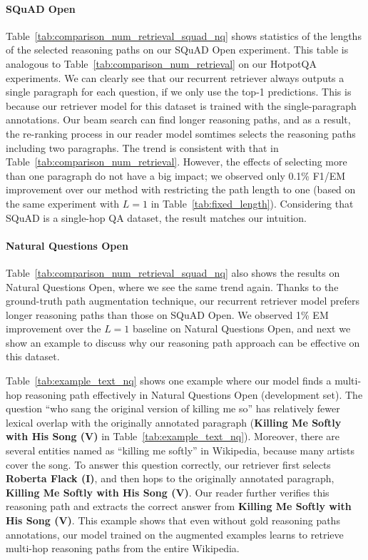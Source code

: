 \paragraph{SQuAD Open}

Table~\ref{tab:comparison_num_retrieval_squad_nq} shows statistics of the lengths of the selected reasoning paths on our SQuAD Open experiment.
This table is analogous to Table~\ref{tab:comparison_num_retrieval} on our HotpotQA experiments.
We can clearly see that our recurrent retriever always outputs a single paragraph for each question, if we only use the top-1 predictions.
This is because our retriever model for this dataset is trained with the single-paragraph annotations.
Our beam search can find longer reasoning paths, and as a result, the re-ranking process in our reader model somtimes selects the reasoning paths including two paragraphs.
The trend is consistent with that in Table~\ref{tab:comparison_num_retrieval}.
However, the effects of selecting more than one paragraph do not have a big impact; we observed only 0.1\% F1/EM improvement over our method with restricting the path length to one (based on the same experiment with $L=1$ in Table~\ref{tab:fixed_length}).
Considering that SQuAD is a single-hop QA dataset, the result matches our intuition.

\paragraph{Natural Questions Open}

Table~\ref{tab:comparison_num_retrieval_squad_nq} also shows the results on Natural Questions Open, where we see the same trend again.
Thanks to the ground-truth path augmentation technique, our recurrent retriever model prefers longer reasoning paths than those on SQuAD Open.
We observed 1\% EM improvement over the $L=1$ baseline on Natural Questions Open, and next we show an example to discuss why our reasoning path approach can be effective on this dataset.

Table~\ref{tab:example_text_nq} shows one example where our model finds a multi-hop reasoning path effectively in Natural Questions Open (development set).
The question ``who sang the original version of killing me so'' has relatively fewer lexical overlap with the originally annotated paragraph ({\bf Killing Me Softly with His Song (V)} in Table~\ref{tab:example_text_nq}).
Moreover, there are several entities named as ``killing me softly'' in Wikipedia, because many artists cover the song. 
To answer this question correctly, our retriever first selects {\bf Roberta Flack (I)}, and then hops to the originally annotated paragraph, {\bf Killing Me Softly with His Song (V)}. 
Our reader further verifies this reasoning path and extracts the correct answer from  {\bf Killing Me Softly with His Song (V)}.
This example shows that even without gold reasoning paths annotations, our model trained on the augmented examples learns to retrieve multi-hop reasoning paths from the entire Wikipedia.

